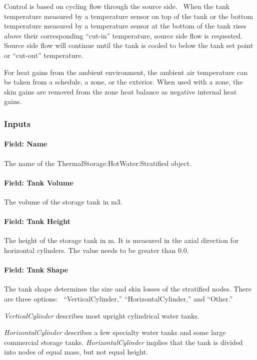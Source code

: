 Control is based on cycling flow through the source side.~ When the tank
temperature measured by a temperature sensor on top of the tank or the bottom
temperature measured by a temperature sensor at the bottom of the tank rises
above their corresponding ``cut-in'' temperature, source side flow is
requested.~ Source side flow will continue until the tank is cooled to below the
tank set point or ``cut-out'' temperature.

For heat gains from the ambient environment, the ambient air temperature can be
taken from a schedule, a zone, or the exterior. When used with a zone, the skin
gains are removed from the zone heat balance as negative internal heat gains.

\subsubsection{Inputs}\label{inputs-thermalstoragehotwaterstratified}

\paragraph{Field: Name}\label{field-name-thermalstoragehotwaterstratified}
The name of the ThermalStorage:HotWater:Stratified object.
\paragraph{Field: Tank Volume}
The volume of the storage tank in m3.
\paragraph{Field: Tank Height}
The height of the storage tank in m. It is measured in the axial direction for horizontal cylinders. The value needs to be greater than 0.0.
\paragraph{Field: Tank Shape}\label{field-tank-shape-thermalstoragehotwaterstratified}
The tank shape determines the size and skin losses of the stratified nodes. There are three options:~ ``VerticalCylinder,'' ``HorizontalCylinder,'' and ``Other.''

\emph{VerticalCylinder} describes most upright cylindrical water tanks.

\emph{HorizontalCylinder} describes a few specialty water tanks and some large
commercial storage tanks. \emph{HorizontalCylinder} implies that the tank is
divided into nodes of equal mass, but not equal height.

